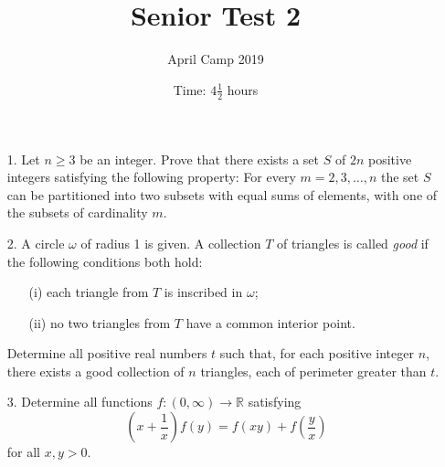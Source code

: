 \documentclass[a4paper, 12pt]{article}
\title{Senior Test 2}
\author{April Camp 2019}
\date{Time: $4 \frac{1}{2}$ hours}
\begin{document}
 \maketitle \vspace{24pt}

\begin{enumerate}

\item[1.]  Let $n \geq 3$ be an integer. Prove that there exists a set $S$ of $2n$ positive integers satisfying the following property: For every $m = 2, 3, \dots, n$ the set $S$ can be partitioned into two subsets with equal sums of elements, with one of the subsets of cardinality $m$.


\vspace{24pt}
\item[2.]  A circle $\omega$ of radius 1 is given. A collection $T$ of triangles is called \emph{good} if the following conditions both hold:
\begin{enumerate}
  \item[(i)]  each triangle from $T$ is inscribed in $\omega$;
  \item[(ii)]  no two triangles from $T$ have a common interior point. 
\end{enumerate}

Determine all positive real numbers $t$ such that, for each positive integer $n$, there exists a good collection of $n$ triangles, each of perimeter greater than $t$.


\vspace{24pt}
\item[3.]  Determine all functions $f : \left(0,\infty\right) \to \mathbb{R}$ satisfying
\[ \left(x+\frac{1}{x}\right) f(y) = f\left(xy\right) +f\left(\frac{y}{x}\right) \]
for all $x,y > 0$. 


\end{enumerate}

\vfill

\centering

\vspace{12mm}
\end{document}
